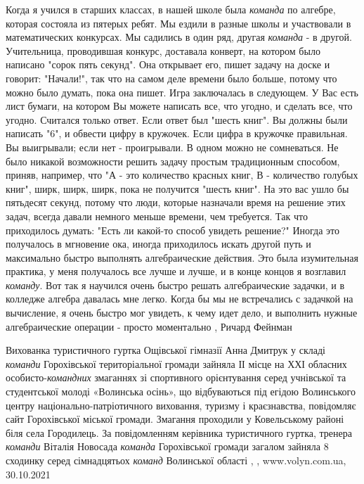 Когда я учился в старших классах, в нашей школе была \emph{команда} по алгебре,
которая состояла из пятерых ребят. Мы ездили в разные школы и участвовали в
математических конкурсах. Мы садились в один ряд, другая \emph{команда} - в
другой.  Учительница, проводившая конкурс, доставала конверт, на котором было
написано "сорок пять секунд". Она открывает его, пишет задачу на доске и
говорит: "Начали!", так что на самом деле времени было больше, потому что можно
было думать, пока она пишет. Игра заключалась в следующем. У Вас есть лист
бумаги, на котором Вы можете написать все, что угодно, и сделать все, что
угодно.  Считался только ответ. Если ответ был "шесть книг". Вы должны были
написать "6", и обвести цифру в кружочек. Если цифра в кружочке правильная. Вы
выигрывали; если нет - проигрывали. В одном можно не сомневаться. Не было
никакой возможности решить задачу простым традиционным способом, приняв,
например, что "А - это количество красных книг, В - количество голубых книг",
ширк, ширк, ширк, пока не получится "шесть книг". На это вас ушло бы пятьдесят
секунд, потому что люди, которые назначали время на решение этих задач, всегда
давали немного меньше времени, чем требуется. Так что приходилось думать: "Есть
ли какой-то способ увидеть решение?" Иногда это получалось в мгновение ока,
иногда приходилось искать другой путь и максимально быстро выполнять
алгебраические действия. Это была изумительная практика, у меня получалось все
лучше и лучше, и в конце концов я возглавил \emph{команду}. Вот так я научился
очень быстро решать алгебраические задачки, и в колледже алгебра давалась мне
легко. Когда бы мы не встречались с задачкой на вычисление, я очень быстро мог
увидеть, к чему идет дело, и выполнить нужные алгебраические операции - просто
моментально
, Ричард Фейнман

Вихованка туристичного гуртка Ощівської гімназії Анна Дмитрук у складі
\emph{команди} Горохівської територіальної громади зайняла ІІ місце на ХХІ
обласних особисто-\emph{командних} змаганнях зі спортивного орієнтування серед
учнівської та студентської молоді «Волинська осінь», що відбуваються під егідою
Волинського центру національно-патріотичного виховання, туризму і краєзнавства,
повідомляє сайт Горохівської міської громади. Змагання проходили у Ковельському
районі біля села Городилець.  За повідомленням керівника туристичного гуртка,
тренера \emph{команди} Віталія Новосада \emph{команда} Горохівської громади загалом зайняла 8
сходинку серед сімнадцятьох \emph{команд} Волинської області
, 
, www.volyn.com.ua, 30.10.2021

